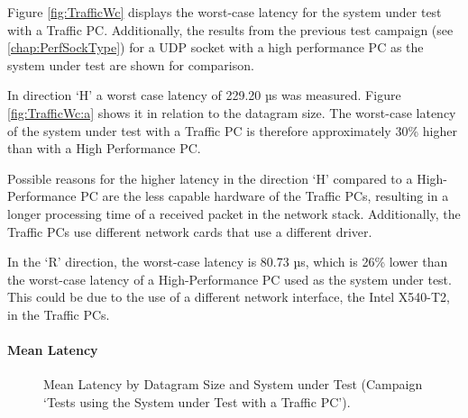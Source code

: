 Figure \ref{fig:TrafficWc} displays the worst-case latency for the system under test with a Traffic PC. Additionally, the results from the previous test campaign (see \ref{chap:PerfSockType}) for a UDP socket with a high performance PC as the system under test are shown for comparison.

In direction `H' a worst case latency of 229.20 µs was measured. Figure \ref{fig:TrafficWc:a} shows it in relation to the datagram size. The worst-case latency of the system under test with a Traffic PC is therefore approximately 30\% higher than with a High Performance PC.

Possible reasons for the higher latency in the direction `H' compared to a High-Performance PC are the  less capable hardware of the Traffic PCs, resulting in a longer processing time of a received packet in the network stack. Additionally, the Traffic PCs use different network cards that use a different driver.

In the `R' direction, the worst-case latency is 80.73 µs, which is 26\% lower than the worst-case latency of a High-Performance PC used as the system under test. This could be due to the use of a different network interface, the Intel X540-T2, in the Traffic PCs.

\paragraph{Mean Latency}
\begin{figure}[h!]
  \centering
  \caption{Mean Latency by Datagram Size and System under Test (Campaign `Tests using the System under Test with a Traffic PC').}
  \label{fig:TrafficMean}
\end{figure}

